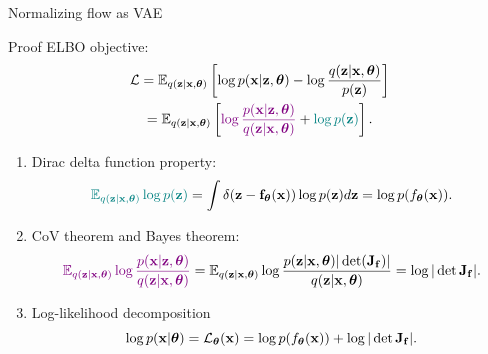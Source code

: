\begin{frame}{Normalizing flow as VAE}
	\begin{block}{Proof}
		ELBO objective:
		\vspace{-0.5cm}
		\begin{multline*}
			\mathcal{L}  = \mathbb{E}_{q(\mathbf{z} | \mathbf{x}, \boldsymbol{\theta})} \left[\log p(\mathbf{x} | \mathbf{z}, \boldsymbol{\theta}) - \log \frac{q(\mathbf{z} | \mathbf{x}, \boldsymbol{\theta})}{p(\mathbf{z})} \right]  \\
			= \mathbb{E}_{q(\mathbf{z} | \mathbf{x}, \boldsymbol{\theta})} \left[{\color{violet}\log \frac{p(\mathbf{x} | \mathbf{z}, \boldsymbol{\theta})}{q(\mathbf{z} | \mathbf{x}, \boldsymbol{\theta})}} + {\color{teal}\log p(\mathbf{z})} \right].
		\end{multline*}
		\vspace{-0.6cm}
		\begin{enumerate}
			\item  Dirac delta function property:
			\vspace{-0.3cm}
			\[
				{\color{teal}\mathbb{E}_{q(\mathbf{z} | \mathbf{x}, \boldsymbol{\theta})} \log p(\mathbf{z})} = \int \delta (\mathbf{z} - \mathbf{f}_{\boldsymbol{\theta}}(\mathbf{x})) \log p(\mathbf{z}) d \mathbf{z} = \log p(f_{\boldsymbol{\theta}}(\mathbf{x})).
			\]
			\vspace{-0.6cm}
			\item CoV theorem and Bayes theorem:
			\vspace{-0.2cm}
			{ \small
			\[ 
				{\color{violet}\mathbb{E}_{q(\mathbf{z} | \mathbf{x}, \boldsymbol{\theta})} \log \frac{p(\mathbf{x} | \mathbf{z}, \boldsymbol{\theta})}{q(\mathbf{z} | \mathbf{x}, \boldsymbol{\theta})}} = \mathbb{E}_{q(\mathbf{z} | \mathbf{x}, \boldsymbol{\theta})} \log \frac{p(\mathbf{z} | \mathbf{x}, \boldsymbol{\theta}) |\det (\mathbf{J}_{\mathbf{f}})|}{q(\mathbf{z} | \mathbf{x}, \boldsymbol{\theta})} = \log |\det \mathbf{J}_{\mathbf{f}}|.
			\]
			}
			\vspace{-0.6cm}
			\item Log-likelihood decomposition
			\vspace{-0.3cm}
			\[
				\log p(\mathbf{x} | \boldsymbol{\theta}) = \mathcal{L}_{\boldsymbol{\theta}}(\mathbf{x}) = \log p(f_{\boldsymbol{\theta}}(\mathbf{x})) +  \log |\det \mathbf{J}_{\mathbf{f}}|.
			\]
		\end{enumerate}
	\end{block}
\end{frame}

